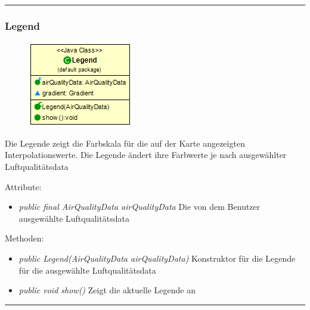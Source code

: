 \rule{\textwidth}{0.4pt}
\subsubsection{Legend}
\begin{minipage}{0.3\textwidth}
    \begin{figure}[H]
        {\centering\includegraphics[scale = 0.5
        ]{media/view/map/Legend_Class.png}}
    \end{figure}
    \end{minipage} \hfill
    \begin{minipage}{0.6\textwidth}
Die Legende zeigt die Farbskala für die auf der Karte angezeigten Interpolationswerte. Die Legende ändert ihre Farbwerte je nach ausgewählter Luftqualitätsdata
\end{minipage}
Attribute: \begin{itemize} [noitemsep]
     \item \emph{public final AirQualityData airQualityData} Die von dem Benutzer ausgewählte Luftqualitätsdata
\end{itemize}
Methoden: \begin{itemize} [noitemsep]
    \item \emph{public Legend(AirQualityData airQualityData)} Konstruktor für die Legende für die ausgewählte Luftqualitätsdata
    \item \emph{public void show()} Zeigt die aktuelle Legende an
\end{itemize}

\rule{\textwidth}{0.4pt}
